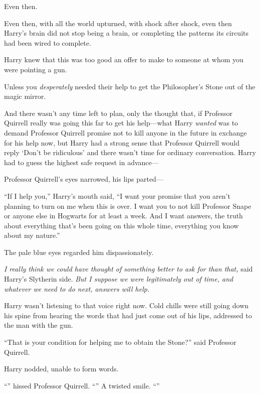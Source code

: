 Even then.

Even then, with all the world upturned, with shock after shock, even then Harry’s brain did not stop being a brain, or completing the patterns its circuits had been wired to complete.

Harry knew that this was too good an offer to make to someone at whom you were pointing a gun.

Unless you \emph{desperately} needed their help to get the Philosopher’s Stone out of the magic mirror.

And there wasn’t any time left to plan, only the thought that, if Professor Quirrell really was going this far to get his help—what Harry \emph{wanted} was to demand Professor Quirrell promise not to kill anyone in the future in exchange for his help now, but Harry had a strong sense that Professor Quirrell would reply ‘Don’t be ridiculous’ and there wasn’t time for ordinary conversation. Harry had to guess the highest safe request in advance—

Professor Quirrell’s eyes narrowed, his lips parted—

“If I help you,” Harry’s mouth said, “I want your promise that you aren’t planning to turn on me when this is over. I want you to not kill Professor Snape or anyone else in Hogwarts for at least a week. And I want answers, the truth about everything that’s been going on this whole time, everything you know about my nature.”

The pale blue eyes regarded him dispassionately.

\emph{I really think we could have thought of something better to ask for than that,} said Harry’s Slytherin side. \emph{But I suppose we were legitimately out of time, and whatever we need to do next, answers will help.}

Harry wasn’t listening to that voice right now. Cold chills were still going down his spine from hearing the words that had just come out of his lips, addressed to the man with the gun.

“That is your condition for helping me to obtain the Stone?” said Professor Quirrell.

Harry nodded, unable to form words.

“” hissed Professor Quirrell. “” A twisted smile. “”

